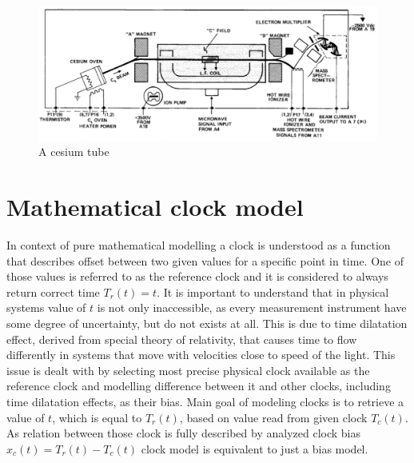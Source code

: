 \begin{figure}[htb] 
	\label{fig:atomic_tube}
	\centering
	\includegraphics[width=\textwidth]{figures/atomic_tube}
	\caption{A cesium tube}
\end{figure}



\section{Mathematical clock model}
In context of pure mathematical modelling a clock is understood as a function that describes
offset between two given values for a specific point in time. One of those values is referred 
to as the reference clock and it is considered to always return correct time $T_{r}(t)=t$.
It is important to understand that in physical systems value of $t$ is not only inaccessible, as
every measurement instrument have some degree of uncertainty, but do not exists at all.
This is due to time dilatation effect, derived from special theory of relativity, that causes
time to flow differently in systems that move with velocities close to speed of the light.
This issue is dealt with by selecting most precise physical clock available as the reference
clock and modelling difference between it and other clocks, including time dilatation effects,
as their bias.
Main goal of modeling clocks is to retrieve a value of $t$, which is equal to $T_{r}(t)$, based
on value read from given clock $T_{c}(t)$. 
As relation between those clock is fully described by analyzed clock bias 
$x_{c}(t)=T_{r}(t)-T_{c}(t)$ clock model is equivalent to just a bias model.

